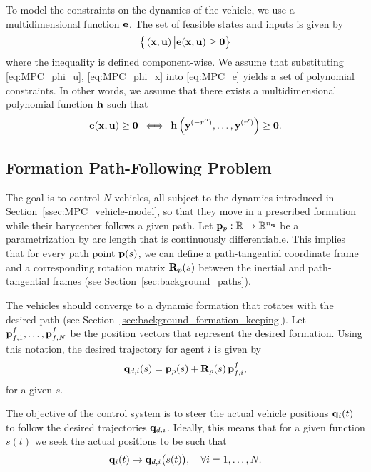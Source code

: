 To model the constraints on the dynamics of the vehicle, we use a multidimensional function $\mathbf{e}$.
The set of feasible states and inputs is given by
\begin{equation}
    \big\{\left(\mathbf{x}, \mathbf{u}\right) \big| \mathbf{e} (\mathbf{x}, \mathbf{u}) \geq \bm{0}\big\}
    \label{eq:MPC_e}
\end{equation}
where the inequality is defined component-wise.
We assume that substituting \eqref{eq:MPC_phi_u}, \eqref{eq:MPC_phi_x} into \eqref{eq:MPC_e} yields a set of polynomial constraints.
In other words, we assume that there exists a multidimensional polynomial function $\mathbf{h}$ such that
\begin{equation}
    \mathbf{e} (\mathbf{x}, \mathbf{u})
    \geq
    \bm{0}
    \, \iff \,
    \mathbf{h} \left( \mathbf{y}^{(-r'')}, \ldots, \mathbf{y}^{(r')} \right)
    \geq
    \bm{0}.
\label{equ:MPC_constraint-h-geq-0}
\end{equation}



\subsection{Formation Path-Following Problem}
\label{ssec:MPC_formation-path-following}



The goal is to control $N$ vehicles, all subject to the dynamics introduced in Section~\ref{ssec:MPC_vehicle-model}, so that they move in a prescribed formation while their barycenter follows a given path.
Let $\mathbf{p}_p : \mathbb{R} \rightarrow \mathbb{R}^{n_{\mathbf{q}}}$ be a parametrization by arc length that is continuously differentiable.
This implies that for every path point $\mathbf{p}(s)$, we can define a path-tangential coordinate frame and a corresponding rotation matrix $\mathbf{R}_p(s)$ between the inertial and path-tangential frames (see Section~\ref{sec:background_paths}).

The vehicles should converge to a dynamic formation that rotates with the desired path (see Section~\ref{sec:background_formation_keeping}).
Let $\mathbf{p}_{f, 1}^f, \ldots, \mathbf{p}_{f, N}^f$ be the position vectors that represent the desired formation.
Using this notation, the desired trajectory for agent $i$ is given by
\begin{equation}
    \mathbf{q}_{d,i}(s) = \mathbf{p}_p(s) + \mathbf{R}_p(s)\, \mathbf{p}_{f, i}^f,
\end{equation} 
for a given $s$.

The objective of the control system is to steer the actual vehicle positions $\mathbf{q}_i(t)$ to follow the desired trajectories $\mathbf{q}_{d,i}$. Ideally, this means that for a given function $s(t)$ we seek the actual positions to be such that
\begin{equation}
    \mathbf{q}_i(t)
    \rightarrow
    \mathbf{q}_{d,i}\big(s(t)\big),
    \quad \forall i = 1, \ldots, N.
    \label{eq:MPC_path_goal}
\end{equation} 

